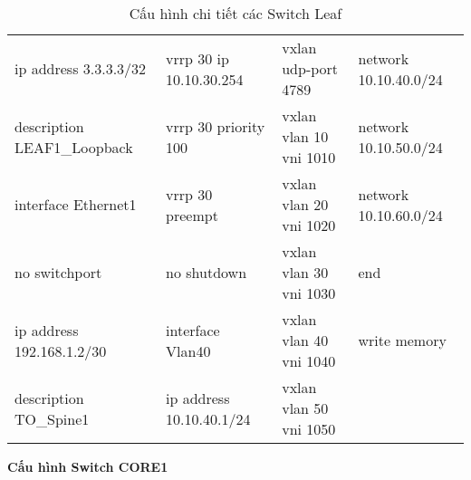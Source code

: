 \begin{table}[H]
\begin{tabular}{|p{4cm}|p{4cm}|p{4cm}|p{4cm}|}
   ip address 3.3.3.3/32	   &vrrp 30 ip 10.10.30.254	   &vxlan udp-port 4789&	   network 10.10.40.0/24\\
   description LEAF1\_Loopback	 &  vrrp 30 priority 100	&   vxlan vlan 10 vni 1010&	   network 10.10.50.0/24\\
interface Ethernet1	   &vrrp 30 preempt	   &vxlan vlan 20 vni 1020&	   network 10.10.60.0/24\\
   no switchport	   &no shutdown	   &vxlan vlan 30 vni 1030&	end\\
   ip address 192.168.1.2/30	&interface Vlan40	   &vxlan vlan 40 vni 1040&	write memory\\
   description TO\_Spine1	   &ip address 10.10.40.1/24	 &  vxlan vlan 50 vni 1050&\\

\hline
\end{tabular}
\caption{Cấu hình chi tiết các Switch Leaf}
\end{table}
\newpage
\textbf{Cấu hình Switch CORE1}
